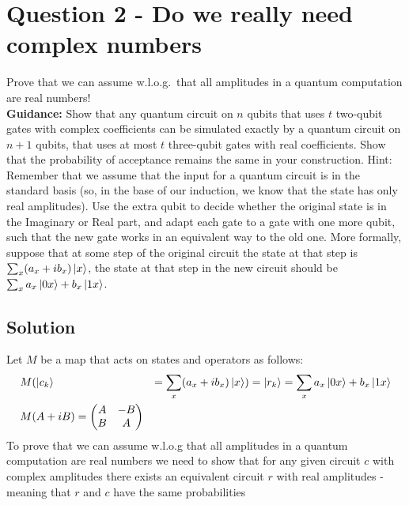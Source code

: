 \section*{Question 2 - Do we really need complex numbers}
Prove that we can assume w.l.o.g.\ that all amplitudes in a quantum computation are real
numbers!\\
\textbf{Guidance:} Show that any quantum circuit on $n$ qubits that uses $t$ two-qubit gates with
complex coefficients can be simulated exactly by a quantum circuit on $n + 1$ qubits, that uses
at most $t$ three-qubit gates with real coefficients.
Show that the probability of acceptance
remains the same in your construction.
Hint: Remember that we assume that the input for a quantum circuit is in the standard
basis (so, in the base of our induction, we know that the state has only real amplitudes).
Use the extra qubit to decide whether the original state is in the Imaginary or Real part,
and adapt each gate to a gate with one more qubit, such that the new gate works in an
equivalent way to the old one.
More formally, suppose that at some step of the original
circuit the state at that step is $\sum_x(a_x + ib_x)\ket{x}$, the state at that step in the new circuit
should be $\sum_x a_x\ket{0x} + b_x\ket{1x}$.

\subsection*{Solution}
Let $M$ be a map that acts on states and operators as follows:
\begin{align*}
    &M(\ket{c_k}&=\sum_x(a_x+ib_x)\ket{x})=\ket{r_k}&=\sum_x a_x\ket{0x}+b_x\ket{1x}\\
    &M(A+iB)=\begin{pmatrix*}
                 A&-B\\
                 B&A
    \end{pmatrix*}
\end{align*}
To prove that we can assume w.l.o.g that all amplitudes in a quantum computation are real numbers we need to show that for any given circuit $c$ with complex amplitudes there exists an equivalent circuit $r$ with real amplitudes - meaning that $r$ and $c$ have the same probabilities \\

